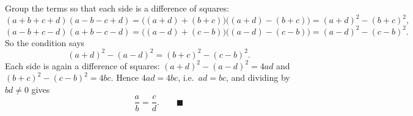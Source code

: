 Group the terms so that each side is a difference of squares:
\[
(a+b+c+d)(a-b-c+d)=\bigl((a+d)+(b+c)\bigr)\bigl((a+d)-(b+c)\bigr)=(a+d)^2-(b+c)^2,
\]
\[
(a-b+c-d)(a+b-c-d)=\bigl((a-d)+(c-b)\bigr)\bigl((a-d)-(c-b)\bigr)=(a-d)^2-(c-b)^2 .
\]
So the condition says
\[
(a+d)^2-(a-d)^2=(b+c)^2-(c-b)^2 .
\]
Each side is again a difference of squares: $(a+d)^2-(a-d)^2=4ad$ and $(b+c)^2-(c-b)^2=4bc$. Hence $4ad=4bc$, i.e.\ $ad=bc$, and dividing by $bd\ne0$ gives
\[
\boxed{\dfrac {a}{b}=\dfrac {c}{d}}. \qquad\blacksquare
\]
